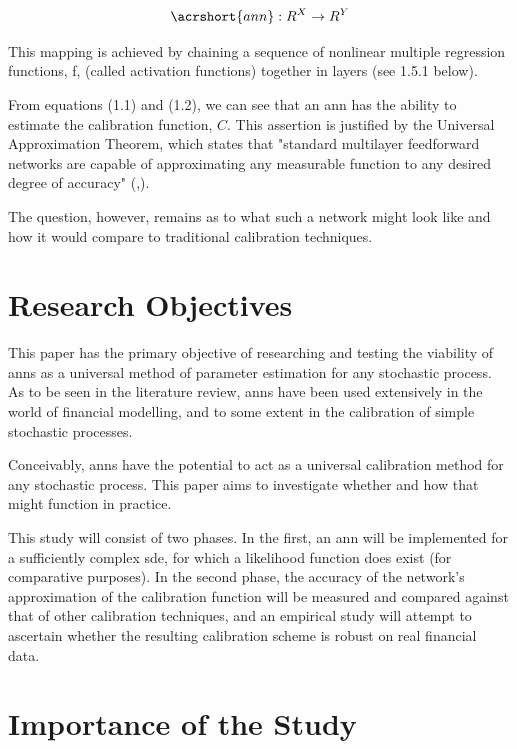 \documentclass[11pt,oneside,openany,a4paper,english, report, goldenblock
]{usthesis}
\begin{document}
\begin{equation}
\acrshort{ann}: R^X \rightarrow R^Y
\end{equation}

This mapping is achieved by chaining a sequence of nonlinear multiple regression functions, f, (called activation functions) together in layers (see 1.5.1 below).


From equations (1.1) and (1.2), we can see that an \acrshort{ann} has the ability to estimate the calibration function, $ C $. 
This assertion is justified by the Universal Approximation Theorem, which states that "standard multilayer feedforward networks are capable of approximating any measurable function to any desired degree of accuracy" (,\citeyear{Hornik}).


The question, however, remains as to what such a network might look like and how it would compare to traditional calibration techniques.

\section{Research Objectives}
This paper has the primary objective of researching and testing the viability of \acrshort{ann}s as a universal method of parameter estimation for any stochastic process. As to be seen in the literature review, \acrshort{ann}s have been used extensively in the world of financial modelling, and to some extent in the calibration of simple stochastic processes.


Conceivably, \acrshort{ann}s have the potential to act as a universal calibration method for any stochastic process. This paper aims to investigate whether and how that might function in practice.


This study will consist of two phases. In the first, an \acrshort{ann} will be implemented for a sufficiently complex \acrshort{sde}, for which a likelihood function does exist (for comparative purposes). In the second phase, the accuracy of the network's approximation of the calibration function will be measured and compared against that of other calibration techniques, and an empirical study will attempt to ascertain whether the resulting calibration scheme is robust on real financial data.

\section{Importance of the Study}
\end{document}
